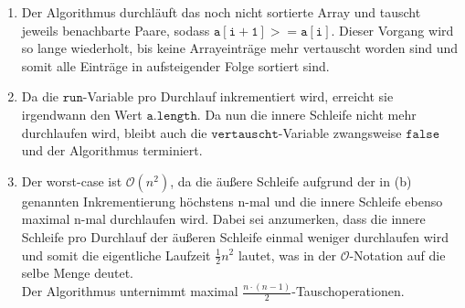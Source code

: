 \documentclass[a4paper,11pt]{article}             %
\begin{document}

\begin{enumerate}
\item Der Algorithmus durchläuft das noch nicht sortierte Array und tauscht jeweils benachbarte Paare, sodass $\mathtt{a[i+1] >= a[i]}$. Dieser Vorgang wird so lange wiederholt, bis keine Arrayeinträge mehr vertauscht worden sind und somit alle Einträge in aufsteigender Folge sortiert sind.
\item Da die $\mathtt{run}$-Variable pro Durchlauf inkrementiert wird, erreicht sie irgendwann den Wert $\mathtt{a.length}$. Da nun die innere Schleife nicht mehr durchlaufen wird, bleibt auch die $\mathtt{vertauscht}$-Variable zwangsweise $\mathtt{false}$ und der Algorithmus terminiert.
\item Der worst-case ist $\mathcal{O}(n^2)$, da die äußere Schleife aufgrund der in (b) genannten Inkrementierung höchstens n-mal und die innere Schleife ebenso maximal n-mal durchlaufen wird. Dabei sei anzumerken, dass die innere Schleife pro Durchlauf der äußeren Schleife einmal weniger durchlaufen wird und somit die eigentliche Laufzeit $\frac{1}{2}n^2$ lautet, was in der $\mathcal{O}$-Notation auf die selbe Menge deutet.\\
Der Algorithmus unternimmt maximal $\frac{n\cdot(n-1)}{2}$-Tauschoperationen.

\end{enumerate}
\end{document}
